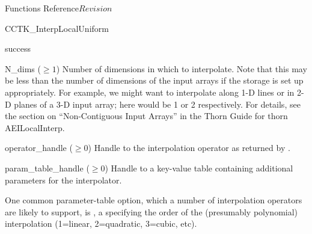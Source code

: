 \begin{cactuspart}{ Functions Reference}{}{$Revision$}
\begin{FunctionDescription}{CCTK\_InterpLocalUniform}
\begin{ResultSection}
\begin{Result}{0}
success
\end{Result}
\end{ResultSection}

\begin{ParameterSection}
\begin{Parameter}{N\_dims ($\ge 1$)}
Number of dimensions in which to interpolate.
Note that this may be less than the number of dimensions of the
input arrays if the storage is set up appropriately.  For example,
we might want to interpolate along 1-D lines or in 2-D planes of a
3-D input array; here  would be 1 or 2 respectively.
For details, see the section on ``Non-Contiguous Input Arrays''
in the Thorn Guide for thorn AEILocalInterp.
\end{Parameter}
\begin{Parameter}{operator\_handle ($\ge 0$)}
\mbox{}
Handle to the interpolation operator as returned by
.
\end{Parameter}
\begin{Parameter}{param\_table\_handle ($\ge 0$)}
Handle to a key-value table containing additional parameters for
the interpolator.

One common parameter-table option, which a number of interpolation
operators are likely to support, is , a 
specifying the order of the (presumably polynomial) interpolation
(1=linear, 2=quadratic, 3=cubic, etc).


\end{Parameter}
\end{ParameterSection}
\end{FunctionDescription}
\end{cactuspart}
